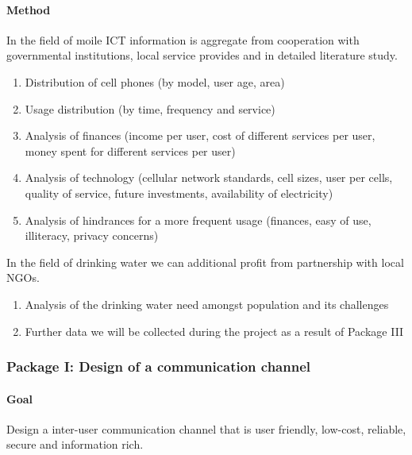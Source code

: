 \documentclass[11pt]{article}
\begin{document}
\paragraph{Method}
In the field of moile ICT information is aggregate from cooperation with governmental institutions, local service provides and in detailed literature study.
\begin{enumerate}
 \item Distribution of cell phones (by model, user age, area)
 \item Usage distribution (by time, frequency and service)
 \item Analysis of finances (income per user, cost of different services per user, money spent for different services per user)
 \item Analysis of technology (cellular network standards, cell sizes, user per cells, quality of service, future investments, availability of electricity)
 \item Analysis of hindrances for a more frequent usage (finances, easy of use, illiteracy, privacy concerns)
\end{enumerate}
In the field of drinking water we can additional profit from partnership with local NGOs.
\begin{enumerate}
 \item Analysis of the drinking water need amongst population and its challenges
 \item Further data we will be collected during the project as a result of Package III
\end{enumerate}







\subsubsection*{Package I: Design of a communication channel}
\paragraph{Goal} Design a inter-user communication channel that is user friendly, low-cost, reliable, secure and information rich.
\end{document}

